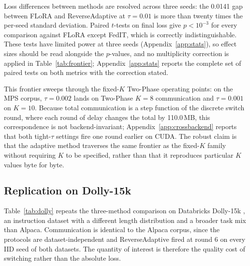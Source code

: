 Loss differences between methods are resolved across three seeds: the 0.0141 gap between FLoRA and ReverseAdaptive at $\tau{=}0.01$ is more than twenty times the per-seed standard deviation. Paired $t$-tests on final loss give $p < 10^{-3}$ for every comparison against FLoRA except FedIT, which is correctly indistinguishable. These tests have limited power at three seeds (Appendix~\ref{app:stats}), so effect sizes should be read alongside the $p$-values, and no multiplicity correction is applied in Table~\ref{tab:frontier}; Appendix~\ref{app:stats} reports the complete set of paired tests on both metrics with the correction stated.



This frontier sweeps through the fixed-$K$ Two-Phase operating points: on the MPS corpus, $\tau{=}0.002$ lands on Two-Phase $K{=}8$ communication and $\tau{=}0.001$ on $K{=}10$. Because total communication is a step function of the discrete switch round, where each round of delay changes the total by 110.0\,MB, this correspondence is not backend-invariant; Appendix~\ref{app:crossbackend} reports that both tight-$\tau$ settings fire one round earlier on CUDA. The robust claim is that the adaptive method traverses the same frontier as the fixed-$K$ family without requiring $K$ to be specified, rather than that it reproduces particular $K$ values byte for byte.

\subsection{Replication on Dolly-15k}
\label{sec:dolly}
Table~\ref{tab:dolly} repeats the three-method comparison on Databricks Dolly-15k \cite{dolly2023}, an instruction dataset with a different length distribution and a broader task mix than Alpaca. Communication is identical to the Alpaca corpus, since the protocols are dataset-independent and ReverseAdaptive fired at round 6 on every IID seed of both datasets. The quantity of interest is therefore the quality cost of switching rather than the absolute loss.


